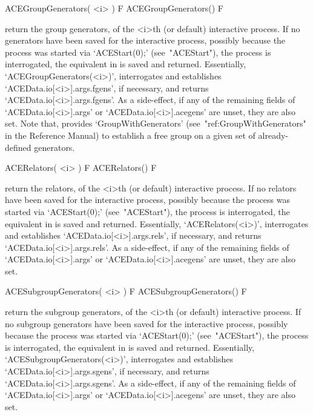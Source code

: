 \enditems


\beginitems

\>ACEGroupGenerators( <i> ) F
\>ACEGroupGenerators() F

return  the  {\GAP}  group  generators,  of  the  <i>th  (or  default)
interactive {\ACE} process. If no generators have been saved  for  the
interactive {\ACE} process, possibly because the process  was  started
via   `ACEStart(0);'   (see~"ACEStart"),   the   {\ACE}   process   is
interrogated,  the  equivalent  in  {\GAP}  is  saved  and   returned.
Essentially,  `ACEGroupGenerators(<i>)',   interrogates   {\ACE}   and
establishes `ACEData.io[<i>].args.fgens', if  necessary,  and  returns
`ACEData.io[<i>].args.fgens'.  As  a  side-effect,  if  any   of   the
remaining       fields       of       `ACEData.io[<i>].args'        or
`ACEData.io[<i>].acegens' are unset, they are  also  set.  Note  that,
{\GAP} provides  `GroupWithGenerators'  (see~"ref:GroupWithGenerators"
in the {\GAP} Reference Manual) to establish a free group on  a  given
set of already-defined generators.

\>ACERelators( <i> ) F
\>ACERelators() F

return the {\GAP} relators, of  the  <i>th  (or  default)  interactive
{\ACE} process. If no relators have been  saved  for  the  interactive
{\ACE}  process,  possibly  because  the  process  was   started   via
`ACEStart(0);' (see~"ACEStart"), the {\ACE} process  is  interrogated,
the  equivalent  in  {\GAP}  is  saved  and   returned.   Essentially,
`ACERelators(<i>)',    interrogates     {\ACE}     and     establishes
`ACEData.io[<i>].args.rels',     if     necessary,     and     returns
`ACEData.io[<i>].args.rels'. As a side-effect, if any of the remaining
fields  of  `ACEData.io[<i>].args'  or  `ACEData.io[<i>].acegens'  are
unset, they are also set.

\>ACESubgroupGenerators( <i> ) F
\>ACESubgroupGenerators() F

return the {\GAP} subgroup  generators,  of  the  <i>th  (or  default)
interactive {\ACE} process. If no subgroup generators have been  saved
for the interactive {\ACE} process, possibly because the  process  was
started via `ACEStart(0);' (see~"ACEStart"),  the  {\ACE}  process  is
interrogated,  the  equivalent  in  {\GAP}  is  saved  and   returned.
Essentially,  `ACESubgroupGenerators(<i>)',  interrogates  {\ACE}  and
establishes `ACEData.io[<i>].args.sgens', if  necessary,  and  returns
`ACEData.io[<i>].args.sgens'.  As  a  side-effect,  if  any   of   the
remaining       fields       of       `ACEData.io[<i>].args'        or
`ACEData.io[<i>].acegens' are unset, they are also set.

